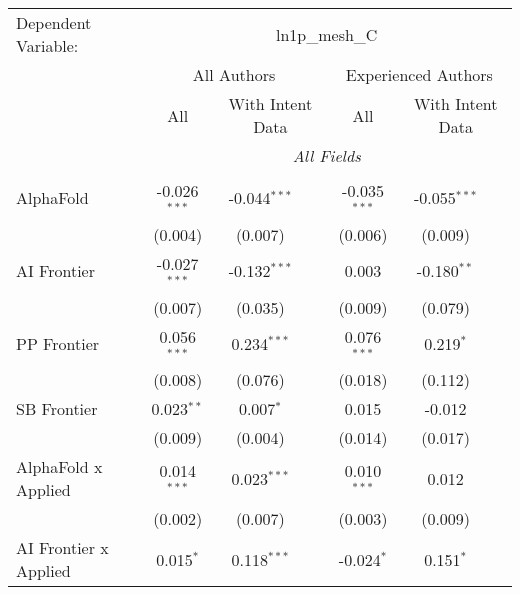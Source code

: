 \begingroup
\centering
\begin{tabular}{lcccccc}
   \tabularnewline \midrule \midrule
   Dependent Variable: & \multicolumn{6}{c}{ln1p\_mesh\_C}\\
 & \multicolumn{3}{c}{All Authors} & \multicolumn{3}{c}{Experienced Authors} \\
\cmidrule(lr){2-4} \cmidrule(lr){5-7}
 & \multicolumn{1}{c}{All} & \multicolumn{2}{c}{With Intent Data} & \multicolumn{1}{c}{All} & \multicolumn{2}{c}{With Intent Data} \\
\cmidrule(lr){2-2} \cmidrule(lr){3-4} \cmidrule(lr){5-5} \cmidrule(lr){6-7}
 & \multicolumn{6}{c}{\textit{All Fields}} \\ \\
   AlphaFold                                   & -0.026$^{***}$ & -0.044$^{***}$ &                & -0.035$^{***}$ & -0.055$^{***}$ &   \\   
                                               & (0.004)        & (0.007)        &                & (0.006)        & (0.009)        &   \\   
   AI Frontier                                 & -0.027$^{***}$ & -0.132$^{***}$ &                & 0.003          & -0.180$^{**}$  &   \\   
                                               & (0.007)        & (0.035)        &                & (0.009)        & (0.079)        &   \\   
   PP Frontier                                 & 0.056$^{***}$  & 0.234$^{***}$  &                & 0.076$^{***}$  & 0.219$^{*}$    &   \\   
                                               & (0.008)        & (0.076)        &                & (0.018)        & (0.112)        &   \\   
   SB Frontier                                 & 0.023$^{**}$   & 0.007$^{*}$    &                & 0.015          & -0.012         &   \\   
                                               & (0.009)        & (0.004)        &                & (0.014)        & (0.017)        &   \\   
   AlphaFold x Applied                         & 0.014$^{***}$  & 0.023$^{***}$  &                & 0.010$^{***}$  & 0.012          &   \\   
                                               & (0.002)        & (0.007)        &                & (0.003)        & (0.009)        &   \\   
   AI Frontier x Applied                       & 0.015$^{*}$    & 0.118$^{***}$  &                & -0.024$^{*}$   & 0.151$^{*}$    &   \\   

\end{tabular}
